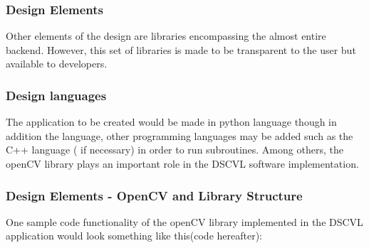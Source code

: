 		
		\subsubsection{Design Elements}
Other elements of the design are libraries encompassing the almost entire backend. However, this set of libraries is made to be transparent to the user but available to developers. 

      	\subsubsection{Design languages}
   The application to be created would be made in python language though in addition the language, other programming languages  may be added such as the C++ language ( if necessary) in order to run subroutines. Among others, the openCV library plays an important role in the DSCVL software implementation.
   
      \subsubsection{Design Elements - OpenCV and Library Structure}\label{des:LibStructure}
 One sample code functionality of the openCV library implemented in the DSCVL application would look something like this(code hereafter): 
 
